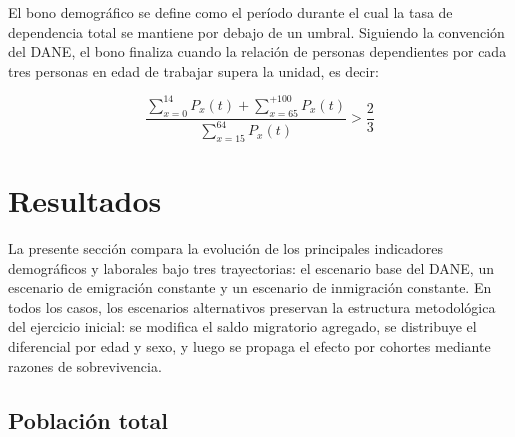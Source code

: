 \documentclass[12pt,a4paper]{article}
\begin{document}
El bono demográfico se define como el período durante el cual la tasa de dependencia total se mantiene por debajo de un umbral. Siguiendo la convención del DANE, el bono finaliza cuando la relación de personas dependientes por cada tres personas en edad de trabajar supera la unidad, es decir:

\begin{equation}
\frac{\displaystyle\sum_{x=0}^{14} P_x(t) + \sum_{x=65}^{+100} P_x(t)}{\displaystyle\sum_{x=15}^{64} P_x(t)} > \frac{2}{3} 
\end{equation}


\section{Resultados}

La presente sección compara la evolución de los principales indicadores demográficos y laborales bajo tres trayectorias: el escenario base del DANE, un escenario de emigración constante y un escenario de inmigración constante. En todos los casos, los escenarios alternativos preservan la estructura metodológica del ejercicio inicial: se modifica el saldo migratorio agregado, se distribuye el diferencial por edad y sexo, y luego se propaga el efecto por cohortes mediante razones de sobrevivencia.

\subsection{Población total}
\end{document}
